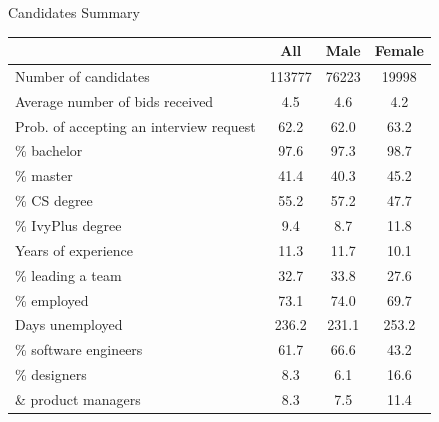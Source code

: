 \begin{frame}{Candidates Summary}
    \begin{table}[h!]
        \footnotesize
        \begin{center}
            \label{tab:candidate_sum}
            \begin{tabular}{lccc}
                & All & Male & Female \\
               \hline
                Number of candidates & 113777 & \textcolor{frenchlilac!45!white}{76223} & 19998 \\
                Average number of bids received & 4.5 & \textcolor{frenchlilac!45!white}{4.6} & 4.2 \\
                Prob. of accepting an interview request & 62.2 & 62.0 & \textcolor{frenchlilac!45!white}{63.2}\\
                \hline
                \% bachelor & 97.6 & 97.3 & \textcolor{frenchlilac!45!white}{98.7} \\
                \% master & 41.4 & 40.3 & \textcolor{frenchlilac!45!white}{45.2} \\
                \% CS degree & 55.2 & \textcolor{frenchlilac!45!white}{57.2} & 47.7 \\
                \% IvyPlus degree & 9.4 & 8.7 & \textcolor{frenchlilac!45!white}{11.8} \\
                \hline 
                Years of experience & 11.3 & \textcolor{frenchlilac!45!white}{11.7} & 10.1 \\
                \% leading a team & 32.7 & \textcolor{frenchlilac!45!white}{33.8} & 27.6 \\
                \% employed & 73.1 & \textcolor{frenchlilac!45!white}{74.0} & 69.7 \\
                Days unemployed & 236.2 & 231.1 & \textcolor{frenchlilac!45!white}{253.2} \\
                \hline 
                \% software engineers & 61.7 & \textcolor{frenchlilac!45!white}{66.6} & 43.2 \\
                \% designers & 8.3 & 6.1 & \textcolor{frenchlilac!45!white}{16.6} \\
                \& product managers & 8.3& 7.5 & \textcolor{frenchlilac!45!white}{11.4}
            \end{tabular}
        \end{center}
    \end{table}
\end{frame}


